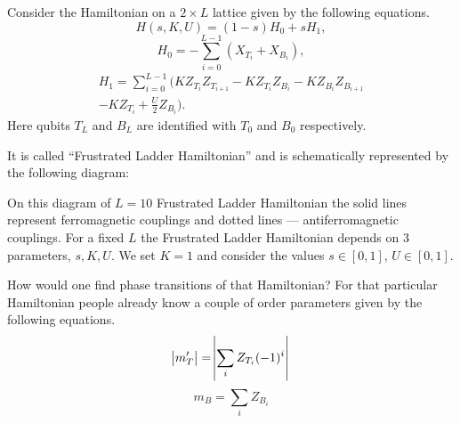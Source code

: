 \documentclass[american,aps,pra,reprint,floatfix,nofootinbib,superscriptaddress]{revtex4-2}
\newcommand{\absmt}{\abs{m_{T}'}}
\begin{document}
Consider the Hamiltonian
on a $2 \times L$ lattice given by the following equations.
\begin{equation}
  \label{eq:Hladder.1}
  H(s,K,U) = (1-s) H_0 + s H_1,
\end{equation}
\begin{equation}
  \label{eq:Hladder.2}
  H_0 = -\sum_{i=0}^{L-1} (X_{T_i} + X_{B_i}),
\end{equation}
\begin{multline}
  \label{eq:Hladder.3}
  H_1 = \sum_{i=0}^{L-1} \biggl(K Z_{T_i} Z_{T_{i+1}} - K Z_{T_i} Z_{B_i}
    - K Z_{B_i} Z_{B_{i+1}} \\
  - K Z_{T_i} + \frac{U}{2} Z_{B_i}\biggr).
\end{multline}
Here qubits $T_L$ and $B_L$ are identified with $T_0$ and $B_0$ respectively.

It is called ``Frustrated Ladder Hamiltonian'' and is schematically represented
by the following diagram:
\begin{center}
  \pgfmathparse{\columnwidth/10.7cm}%
  \edef\tikzscale{\pgfmathresult}%
\end{center}
On this diagram of $L=10$ Frustrated Ladder Hamiltonian
the solid lines represent ferromagnetic couplings and
dotted lines --- antiferromagnetic couplings. For a fixed $L$
the Frustrated Ladder Hamiltonian depends on 3 parameters, $s, K, U$.
We set $K=1$ and consider the values $s\in[0,1]$, $U\in[0,1]$.

How would one find phase transitions of that Hamiltonian? For that particular
Hamiltonian people already know a couple of order parameters given by the
following equations.
\begin{equation}
  \label{eq:mt}
  \absmt = \abs{\sum_i Z_{T_i}(-1)^i}
\end{equation}
\begin{equation}
  \label{eq:mb}
  m_B = \sum_i Z_{B_i}
\end{equation}
\end{document}
